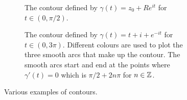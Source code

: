 \documentclass{article}
\begin{document}
\begin{example}
\begin{figure}[ht]
\begin{subfigure}{0.4\textwidth}
                \caption{The contour defined by \(\gamma(t) = z_0 + Re^{it}\) for \(t\in(0, \pi/2)\).}
                \label{fig:contour example 2}
            \end{subfigure}
            \begin{subfigure}{0.9\textwidth}
                \centering
                \caption{The contour defined by \(\gamma(t) = t + i + e^{-it}\) for \(t\in(0, 3\pi)\). Different colours are used to plot the three smooth arcs that make up the contour. The smooth arcs start and end at the points where \(\gamma'(t) = 0\) which is \(\pi/2 + 2n\pi\) for \(n\in\mathbb{Z}\).}
                \label{fig:contour example 3}
            \end{subfigure}
            \caption{Various examples of contours.}
        \end{figure}
        \tikzexternaldisable
    \end{example}
\end{document}
